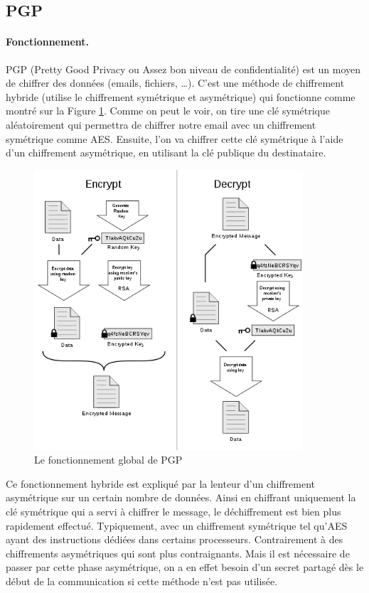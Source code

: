 \subsection{PGP}

\paragraph*{Fonctionnement.}
PGP (Pretty Good Privacy ou Assez bon niveau de confidentialité) est un moyen de chiffrer des données (emails, fichiers, …). C’est une méthode de chiffrement hybride (utilise le chiffrement symétrique et asymétrique) qui fonctionne comme montré sur la Figure \ref{fig:PGP_101}. Comme on peut le voir, on tire une clé symétrique aléatoirement qui permettra de chiffrer notre email avec un chiffrement symétrique comme AES. Ensuite, l'on va chiffrer cette clé symétrique à l'aide d'un chiffrement asymétrique, en utilisant la clé publique du destinataire.

\begin{figure}[h!]
\includegraphics[width=10cm]{images/PGP_101.png}
\centering
\caption{Le fonctionnement global de PGP~\cite{pgpGlobal}}
\label{fig:PGP_101}
\end{figure}

Ce fonctionnement hybride est expliqué par la lenteur d’un chiffrement asymétrique sur un certain nombre de données. Ainsi en chiffrant uniquement la clé symétrique qui a servi à chiffrer le message, le déchiffrement est bien plus rapidement effectué. Typiquement, avec un chiffrement symétrique tel qu’AES ayant des instructions dédiées dans certains processeurs. Contrairement à des chiffrements asymétriques qui sont plus contraignants. Mais il est nécessaire de passer par cette phase asymétrique, on a en effet besoin d'un secret partagé dès le début de la communication si cette méthode n'est pas utilisée.

